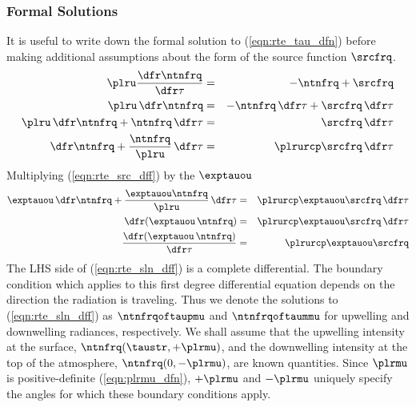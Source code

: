 \documentclass[12pt]{article}
\begin{document}
\subsubsection[Formal Solutions]{Formal Solutions}\label{sxn:rte_sln_frm}
It is useful to write down the formal solution to
(\ref{eqn:rte_tau_dfn}) before making additional assumptions about
the form of the source function $\srcfrq$.
\begin{eqnarray}
\plru \frac{\dfr\ntnfrq}{\dfr\tau} & = & - \ntnfrq + \srcfrq \nonumber \\
\plru \,\dfr\ntnfrq & = & - \ntnfrq \,\dfr\tau + \srcfrq \,\dfr\tau \nonumber \\
\plru \,\dfr\ntnfrq + \ntnfrq \,\dfr\tau & = & \srcfrq \,\dfr\tau \nonumber \\
\dfr\ntnfrq + \frac{\ntnfrq}{\plru} \,\dfr\tau & = & \plrurcp \srcfrq \,
\dfr\tau
\label{eqn:rte_src_dff}
\end{eqnarray}
Multiplying (\ref{eqn:rte_src_dff}) by the 
$\exptauou$ 
\begin{eqnarray}
\exptauou \,\dfr\ntnfrq + \frac{\exptauou \ntnfrq}{\plru} \,\dfr\tau & =
& \plrurcp \exptauou \srcfrq \,\dfr\tau \nonumber \\
\dfr( \exptauou \, \ntnfrq ) & = & \plrurcp \exptauou \srcfrq
\,\dfr\tau \nonumber \\
\frac{\dfr( \exptauou \, \ntnfrq )}{\dfr\tau} & = & \plrurcp
\exptauou \srcfrq 
\label{eqn:rte_sln_dff}
\end{eqnarray}
The LHS side of (\ref{eqn:rte_sln_dff}) is a complete differential.
The boundary condition which applies to this first degree differential
equation depends on the direction the radiation is traveling. 
Thus we denote the solutions to (\ref{eqn:rte_sln_dff}) as
$\ntnfrqoftaupmu$ and $\ntnfrqoftaummu$ for upwelling and downwelling 
radiances, respectively.
We shall assume that the upwelling intensity at the surface,
$\ntnfrq(\taustr,+\plrmu)$, and the downwelling intensity at the top
of the atmosphere, $\ntnfrq(0,-\plrmu)$, are known quantities. 
Since $\plrmu$ is positive-definite (\ref{eqn:plrmu_dfn}), $+\plrmu$ and 
$-\plrmu$ uniquely specify the angles for which these boundary
conditions apply. 
\end{document}
